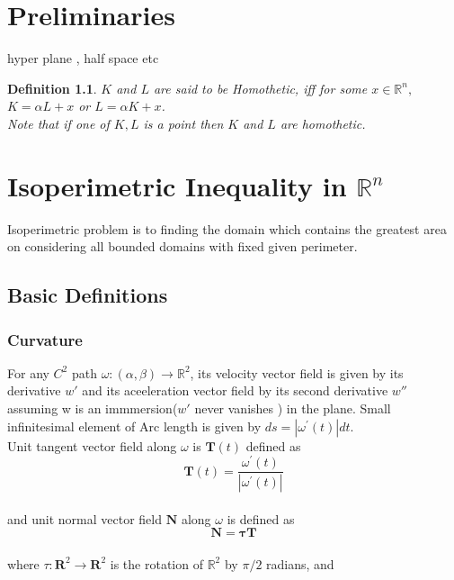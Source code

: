 \documentclass[oneside]{book}
\newtheorem{mydef}{Definition}
\begin{document}
\chapter{Preliminaries }
\label{chap:c2}
hyper plane , half space etc 
\begin{mydef}
$K$ and $L$ are said to be Homothetic, iff for some $x  \in \mathbb{R}^n,$ $K = \alpha L + x$ or $L=\alpha K+x $.\\
Note that if one of $K,L $ is a point then $K $ and $L$ are homothetic.
\end{mydef}
\label{def:2.1}
 \chapter{Isoperimetric Inequality in $\mathbb{R}^{n}$} 
 \label{chap:c3}
 Isoperimetric problem is to finding the domain which contains the greatest area on considering  all bounded domains with fixed given perimeter.
 

\section{\textbf{Basic Definitions}}\label{s:2}
\subsection{Curvature}
\label{ss:1}
    
For any $C^{2}$ path $\omega:(\alpha, \beta) \rightarrow \mathbb{R}^{2}$, its velocity vector field is given by its derivative $w'$ and its aceeleration vector field by its second derivative $w''$ assuming w is an immmersion($w'$ never vanishes ) in the plane.  Small infinitesimal element of Arc length is given by  $d s=\left|\omega^{\prime}(t)\right| d t$.
\\Unit tangent vector field along $\omega$ is $\mathbf{T}(t)$ defined as \\

\begin{equation}
\label{eq1}  
\textbf{{T}}(t)=\frac{\omega^{\prime}(t)}{\left|\omega^{\prime}(t)\right|}
\end{equation}  \\
and unit normal vector field $\mathbf{N}$ along $\omega$ is defined as 
\begin{equation}
\label{eq2}  
     \mathbf{N}=\mathbf{\tau} \mathbf{T}
\end{equation} \\
   where $ \tau: \mathbf{R}^{2} \rightarrow \mathbf{R}^{2}$ is the rotation of $\mathbb{R}^{2}$ by $\pi / 2$ radians, and
\end{document}
